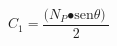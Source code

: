 \[C_{\mathrm{1}}\mathrm{=}\frac{\mathrm{(}N_P\mathrm{\bullet }{\mathrm{sen} \theta \mathrm{)}\ }}{\mathrm{2}}\]